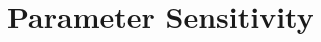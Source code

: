 \documentclass[11pt,a4paper]{article}
\begin{document}
\section{Parameter Sensitivity}

%
%


\end{document}
